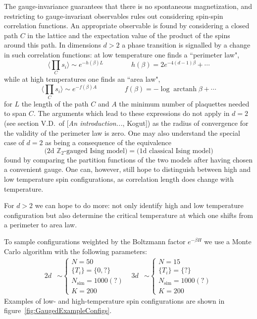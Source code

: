 \documentclass[11pt]{article}
\begin{document}
The gauge-invariance guarantees that there is no spontaneous magnetization, and restricting to gauge-invariant observables rules out considering spin-spin correlation functions. An appropriate observable is found by considering a closed path $C$ in the lattice and the expectation value of the product of the spins around this path. In dimensions $d>2$ a phase transition is signalled by a change in such correlation functions: at low temperature one finds a ``perimeter law",
\begin{equation}
    \Big\langle\prod_C s_i\Big\rangle \sim e^{-h(\beta)L} \qquad\qquad h(\beta) = 2e^{-4(d-1)\beta} + \cdots
\end{equation}
while at high temperatures one finds an ``area law",
\begin{equation}
    \Big\langle\prod_C s_i\Big\rangle \sim e^{-f(\beta)A} \qquad\qquad f(\beta) = -\log\operatorname{arctanh}{\beta} + \cdots
\end{equation}
for $L$ the length of the path $C$ and $A$ the minimum number of plaquettes needed to span $C$. The arguments which lead to these expressions do not apply in $d=2$ (see section V.D.~of [\textit{An introduction...}, Kogut]) as the radius of convergence for the validity of the perimeter law is zero. One may also understand the special case of $d=2$ as being a consequence of the equivalence
\begin{equation}
    \big(\text{2d }\mathbb{Z}_2\text{-gauged Ising model}\big) = \big( \text{1d classical Ising model} \big)
\end{equation}
found by comparing the partition functions of the two models after having chosen a convenient gauge. One can, however, still hope to distinguish between high and low temperature spin configurations, as correlation length does change with temperature.

For $d>2$ we can hope to do more: not only identify high and low temperature configuration but also determine the critical temperature at which one shifts from a perimeter to area law.

To sample configurations weighted by the Boltzmann factor $e^{-\beta H}$ we use a Monte Carlo algorithm with the following parameters:
\begin{align}
    2d&\sim\left\{\begin{array}{l}
        N = 50\\
        \{T_i\} = \{0,?\}\\
        N_\text{sim} = 1000(?)\\
        K = 200
    \end{array}\right. & 3d&\sim\left\{\begin{array}{l}
        N = 15\\
        \{T_i\} = \{?\}\\
        N_\text{sim} = 1000(?)\\
        K = 200
    \end{array}\right.
\end{align}
Examples of low- and high-temperature spin configurations are shown in figure~\ref{fig:GaugedExampleConfigs}.
\end{document}

